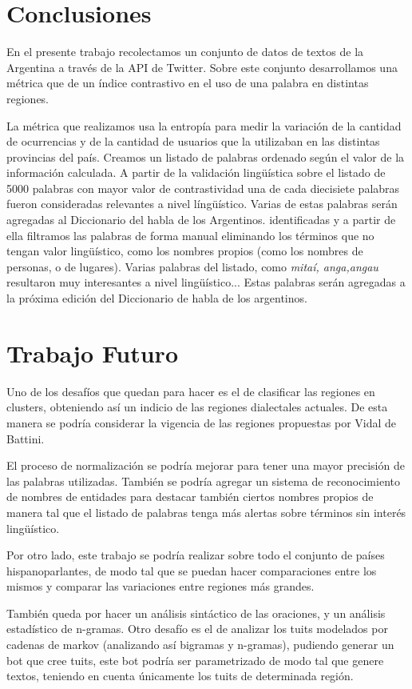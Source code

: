 \section{Conclusiones}
En el presente trabajo recolectamos un conjunto de datos de textos de la Argentina a través de la API de Twitter. Sobre este conjunto desarrollamos una métrica que de un índice contrastivo en el uso de una palabra en distintas regiones.

La métrica que realizamos usa la entropía para medir la variación de la cantidad de ocurrencias y de la cantidad de usuarios que la utilizaban en las distintas provincias del país. Creamos un listado de palabras ordenado según el valor de la información calculada. A partir de la validación lingüística sobre el listado de 5000 palabras con mayor valor de contrastividad una de cada diecisiete palabras fueron consideradas relevantes a nivel língüístico. Varias de estas palabras serán agregadas al Diccionario del habla de los Argentinos. identificadas  y a partir de ella filtramos las palabras de forma manual eliminando los términos que no tengan valor lingüístico, como los nombres propios (como los nombres de personas, o de lugares). Varias palabras del listado, como \textit{mitaí, anga,angau} resultaron muy interesantes a nivel lingüístico... Estas palabras serán agregadas a la próxima edición del Diccionario de habla de los argentinos.

\section{Trabajo Futuro}

Uno de los desafíos que quedan para hacer es el de clasificar las regiones en clusters, obteniendo así un indicio de las regiones dialectales actuales. De esta manera se podría considerar la vigencia de las regiones propuestas por Vidal de Battini. %

El proceso de normalización se podría mejorar para tener una mayor precisión de las palabras utilizadas. También se podría agregar un sistema de reconocimiento de nombres de entidades para destacar también ciertos nombres propios de manera tal que el listado de palabras tenga más alertas sobre términos sin interés lingüístico.

Por otro lado, este trabajo se podría realizar sobre todo el conjunto de países hispanoparlantes, de modo tal que se puedan hacer comparaciones entre los mismos y comparar las variaciones entre regiones más grandes.

También queda por hacer un análisis sintáctico de las oraciones, y un análisis estadístico de n-gramas.
Otro desafío es el de analizar los tuits modelados por cadenas de markov (analizando así bigramas y n-gramas), pudiendo generar un bot que cree tuits, este bot podría ser parametrizado de modo tal que genere textos, teniendo en cuenta únicamente los tuits de determinada región.

